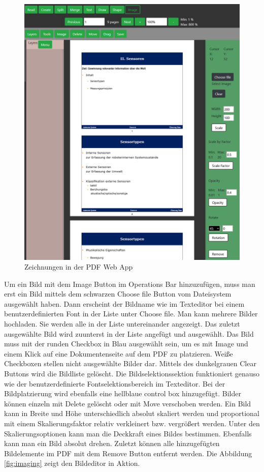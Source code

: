 \begin{figure}[!htbp]
	\centering
	\includegraphics[width=1\textwidth]{"images/images.png"}
	\caption{Zeichnungen in der PDF Web App}
	\label{fig:images}
\end{figure}

Um ein Bild mit dem Image Button im Operations Bar hinzuzufügen, muss man erst ein Bild mittels dem schwarzen Choose file Button vom Dateisystem ausgewählt haben. Dann erscheint der Bildname wie im Texteditor bei einem benutzerdefinierten Font in der Liste unter Choose file. Man kann mehrere Bilder hochladen. Sie werden alle in der Liste untereinander angezeigt. Das zuletzt ausgewählte Bild wird zuunterst in der Liste angefügt und ausgewählt. Das Bild muss mit der runden Checkbox in Blau ausgewählt sein, um es mit Image und einem Klick auf eine Dokumentenseite auf dem PDF zu platzieren. Weiße Checkboxen stellen nicht ausgewählte Bilder dar. Mittels des dunkelgrauen Clear Buttons wird die Bildliste gelöscht. Die Bildselektionssektion funktioniert genauso wie der benutzerdefinierte Fontselektionsbereich im Texteditor. Bei der Bildplatzierung wird ebenfalls eine hellblaue control box hinzugefügt. Bilder können einzeln mit Delete gelöscht oder mit Move verschoben werden. Ein Bild kann in Breite und Höhe unterschiedlich absolut skaliert werden und proportional mit einem Skalierungsfaktor relativ verkleinert bzw. vergrößert werden. Unter den Skalierungsoptionen kann man die Deckkraft eines Bildes bestimmen. Ebenfalls kann man ein Bild absolut drehen. Zuletzt können alle hinzugefügten Bildelemente im PDF mit dem Remove Button entfernt werden. Die Abbildung \ref{fig:imaging} zeigt den Bildeditor in Aktion.


